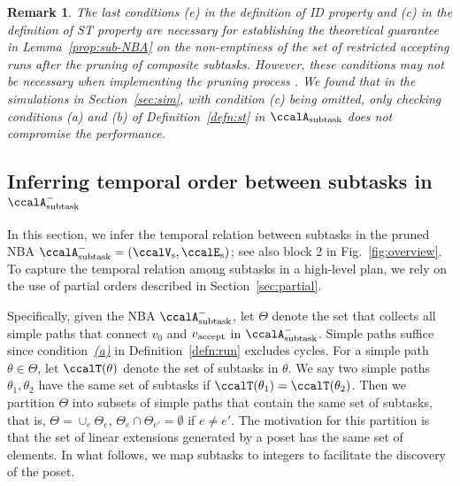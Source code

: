 \documentclass[Afour,sageh,times]{sagej}
\newtheorem{rem}[thm]{Remark}
\newcommand{\auto}[1]{\ccalA_{\textup{#1}}}
\newcommand{\vertex}[1]{v_{\textup{#1}}}
\begin{document}
\begin{rem}
  The last conditions {\it (e)} in the definition of ID property and {\it (c)} in the definition of ST property are necessary for establishing the theoretical guarantee in Lemma~\ref{prop:sub-NBA}  on the non-emptiness of the set of restricted accepting runs after the pruning of composite subtasks. However, these conditions may not be necessary when implementing the pruning process%
  .  We found that in the simulations in Section~\ref{sec:sim}, with condition {\it (c)} being omitted, only checking conditions {\it (a)} and {\it (b)} of Definition~\ref{defn:st} in $\auto{subtask}$  does not compromise  the performance.

\end{rem}



\subsection{Inferring temporal order between subtasks in  $\auto{subtask}^-$}\label{sec:poset}
In this section,  we infer the temporal relation between subtasks in the pruned NBA $\auto{subtask}^- = (\ccalV_\text{s}, \ccalE_\text{s})$; see also block 2 in Fig.~\ref{fig:overview}.  To capture the temporal relation among subtasks in a high-level plan,  we rely on the use of partial orders described in Section~\ref{sec:partial}.


Specifically, given the NBA $\auto{subtask}^-$, let $\Theta$ denote the set that collects all simple paths that connect $v_0$ and $\vertex{accept}$ in $\auto{subtask}^-$. Simple paths suffice since condition~\hyperref[cond:a]{\it (a)} in Definition~\ref{defn:run} excludes cycles. %
For a simple path $\theta \in\Theta$, let $\ccalT(\theta)$ denote the set of subtasks in $\theta$. We say two simple paths $\theta_1, \theta_2$ have the same set of subtasks if $\ccalT(\theta_1) =\ccalT(\theta_2)$. Then we partition $\Theta$ into subsets of  simple paths that contain the same set of subtasks, that is, $\Theta = \cup_e \Theta_e$, $\Theta_e \cap \Theta_{e'} = \emptyset$ if $e\not=e'$. The motivation for this partition is that the set of linear extensions generated by a poset has the same set of elements. {In what follows, we map subtasks to integers to facilitate the discovery of the  poset.}
\end{document}
